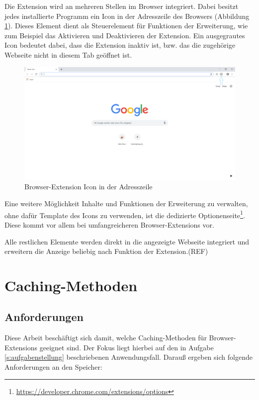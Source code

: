 Die Extension wird an mehreren Stellen im Browser integriert. Dabei besitzt jedes installierte Programm ein Icon in der Adresszeile des Browsers (Abbildung \ref{browser1}). Dieses Element dient als Steuerelement für Funktionen der Erweiterung, wie zum Beispiel das Aktivieren und Deaktivieren der Extension. Ein ausgegrautes Icon bedeutet dabei, dass die Extension inaktiv ist, bzw. das die zugehörige Webseite nicht in diesem Tab geöffnet ist.
\begin{figure}[ht]
	\centering
	\includegraphics[width=1\textwidth]{pics/browser1.png}
	\caption{Browser-Extension Icon in der Adresszeile}
	\label{browser1}
\end{figure}

Eine weitere Möglichkeit Inhalte und Funktionen der Erweiterung zu verwalten, ohne dafür Template des Icons zu verwenden, ist die dedizierte Optionenseite\footnote{\url{https://developer.chrome.com/extensions/options}}. Diese kommt vor allem bei umfangreicheren Browser-Extensions vor.

Alle restlichen Elemente werden direkt in die angezeigte Webseite integriert und erweitern die Anzeige beliebig nach Funktion der Extension.(REF)
\section{Caching-Methoden}
\label{s:cachingmethoden}

\subsection{Anforderungen}
\label{ss:cacheanforderungen}

Diese Arbeit beschäftigt sich damit, welche Caching-Methoden für Browser-Extensions geeignet sind. Der Fokus liegt hierbei auf den in Aufgabe \ref{s:aufgabenstellung} beschriebenen Anwendungsfall. Darauß ergeben sich folgende Anforderungen an den Speicher:

